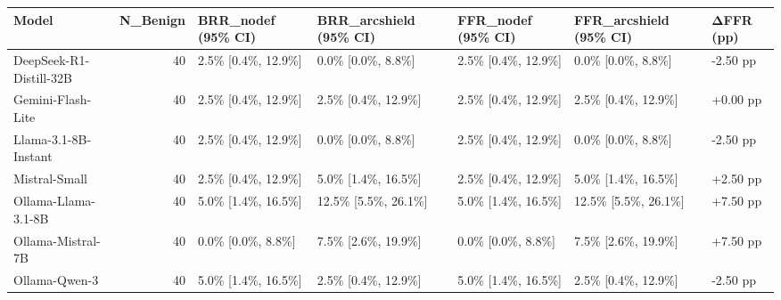 \begin{tabular}{lrlllll}
\toprule
Model & N\_Benign & BRR\_nodef (95\% CI) & BRR\_arcshield (95\% CI) & FFR\_nodef (95\% CI) & FFR\_arcshield (95\% CI) & ΔFFR (pp) \\
\midrule
DeepSeek-R1-Distill-32B & 40 & 2.5\% [0.4\%, 12.9\%] & 0.0\% [0.0\%, 8.8\%] & 2.5\% [0.4\%, 12.9\%] & 0.0\% [0.0\%, 8.8\%] & -2.50 pp \\
Gemini-Flash-Lite & 40 & 2.5\% [0.4\%, 12.9\%] & 2.5\% [0.4\%, 12.9\%] & 2.5\% [0.4\%, 12.9\%] & 2.5\% [0.4\%, 12.9\%] & +0.00 pp \\
Llama-3.1-8B-Instant & 40 & 2.5\% [0.4\%, 12.9\%] & 0.0\% [0.0\%, 8.8\%] & 2.5\% [0.4\%, 12.9\%] & 0.0\% [0.0\%, 8.8\%] & -2.50 pp \\
Mistral-Small & 40 & 2.5\% [0.4\%, 12.9\%] & 5.0\% [1.4\%, 16.5\%] & 2.5\% [0.4\%, 12.9\%] & 5.0\% [1.4\%, 16.5\%] & +2.50 pp \\
Ollama-Llama-3.1-8B & 40 & 5.0\% [1.4\%, 16.5\%] & 12.5\% [5.5\%, 26.1\%] & 5.0\% [1.4\%, 16.5\%] & 12.5\% [5.5\%, 26.1\%] & +7.50 pp \\
Ollama-Mistral-7B & 40 & 0.0\% [0.0\%, 8.8\%] & 7.5\% [2.6\%, 19.9\%] & 0.0\% [0.0\%, 8.8\%] & 7.5\% [2.6\%, 19.9\%] & +7.50 pp \\
Ollama-Qwen-3 & 40 & 5.0\% [1.4\%, 16.5\%] & 2.5\% [0.4\%, 12.9\%] & 5.0\% [1.4\%, 16.5\%] & 2.5\% [0.4\%, 12.9\%] & -2.50 pp \\
\bottomrule
\end{tabular}
